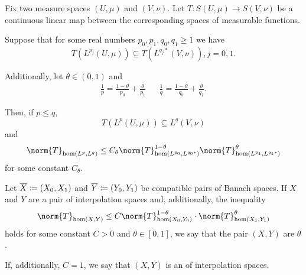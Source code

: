 \begin{theorem}
  Fix two measure spaces \( (U, \mu) \) and \( (V, \nu) \). Let \( T: S(U, \mu) \to S(V, \nu) \) be a continuous linear map between the corresponding spaces of measurable functions.

  Suppose that for some real numbers \( p_0, p_1, q_0, q_1 \geq 1 \) we have
  \begin{equation*}
    T(L^{p_j}(U, \mu)) \subseteq T(L^{q_j *}(V, \nu)), j = 0, 1.
  \end{equation*}

  Additionally, let \( \theta \in (0, 1) \) and
  \begin{align*}
    \frac 1 p = \frac {1 - \theta} {p_0} + \frac {\theta} {p_1}
    &&
    \frac 1 q = \frac {1 - \theta} {q_0} + \frac {\theta} {q_1}.
  \end{align*}

  Then, if \( p \leq q \),
  \begin{equation*}
    T(L^p(U, \mu)) \subseteq L^q(V, \nu)
  \end{equation*}
  and
  \begin{equation*}
    \norm{T}_{\hom(L^p, L^q)} \leq C_\theta \norm{T}_{\hom(L^{p_0}, L^{q_0*})}^{1 - \theta} \norm{T}_{\hom(L^{p_1}, L^{q_1*})}^\theta
  \end{equation*}
  for some constant \( C_\theta \).
\end{theorem}

\begin{definition}\label{def:banach_interpolation_space_exponent}
  Let \( \oline{X} \coloneqq ( X_0, X_1 ) \) and \( \oline{Y} \coloneqq ( Y_0, Y_1 ) \) be compatible pairs of Banach spaces. If \( X \) and \( Y \) are a pair of interpolation spaces and, additionally, the inequality
  \begin{equation}\label{da:def:banach_interpolation_space_exponent}
    \norm{T}_{\hom(X, Y)} \leq C \norm{T}_{\hom(X_0, Y_0)}^{1-\theta} \cdot \norm{T}_{\hom(X_1, Y_1)}^{\theta}
  \end{equation}
  holds for some constant \( C > 0 \) and \( \theta \in [0, 1] \), we say that the pair \( (X, Y) \) are  \( \theta \).

  If, additionally, \( C = 1 \), we say that \( (X, Y) \) is an  of interpolation spaces.
\end{definition}

